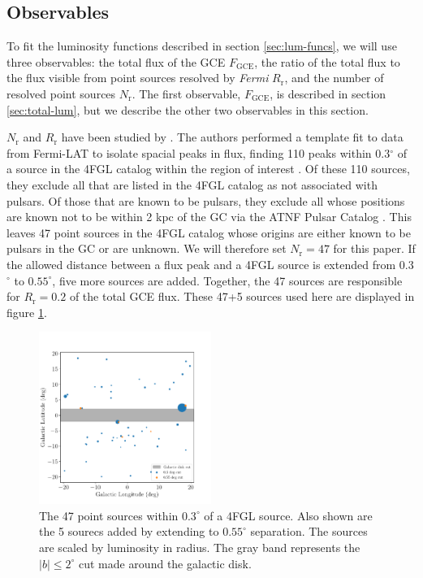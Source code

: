 \documentclass[a4paper,11pt]{article}
\newcommand{\comment}[1]{\emph{\color{red}{#1}}}
\begin{document}
\subsection{Observables}
\label{sec:observables}
To fit the luminosity functions described in section \ref{sec:lum-funcs}, we will use three observables: the total flux of the GCE $F_\text{GCE}$, the ratio of the total flux to the flux visible from point sources resolved by \textit{Fermi} $R_\text{r}$, and the number of resolved point sources $N_\text{r}$. The first observable, $F_\text{GCE}$, is described in section \ref{sec:total-lum}, but we describe the other two observables in this section.

$N_\text{r}$ and $R_\text{r}$ have been studied by \comment{Some technical name for the Fermilab team.} \cite{Zhong:2019ycb}. The authors performed a template fit to data from Fermi-LAT to isolate spacial peaks in flux, finding 110 \comment{(I got 110; their paper says 107)} peaks within 0.3$^\circ$ of a source in the 4FGL catalog within the region of interest \cite{Abdollahi_2020}. Of these 110 sources, they exclude all that are listed in the 4FGL catalog as not associated with pulsars. Of those that are known to be pulsars, they exclude all whose positions are known not to be within 2 kpc of the GC via the ATNF Pulsar Catalog \cite{Hobbs04}. This leaves 47 point sources in the 4FGL catalog whose origins are either known to be pulsars in the GC or are unknown. We will therefore set $N_\text{r} = 47$ for this paper. If the allowed distance between a flux peak and a 4FGL source is extended from 0.3$^\circ$ to $0.55^\circ$, five more sources are added. Together, the 47 sources are responsible for $R_\text{r}=0.2$ of the total GCE flux. \comment{Shouldn't I actually redo this addition given the fact that I'm now not using the same GCE flux as Fermilab?} These 47+5 sources used here are displayed in figure \ref{fig:47-sources}.

\begin{figure}
    \centering
    \includegraphics[width=0.5\textwidth]{figs/point-source-positions.pdf}
    \caption{The 47 point sources within $0.3^\circ$ of a 4FGL source. Also shown are the 5 sourecs added by extending to $0.55^\circ$ separation. The sources are scaled by luminosity in radius. The gray band represents the $|b| \leq 2^\circ$ cut made around the galactic disk.}
    \label{fig:47-sources}
\end{figure}
\end{document}
